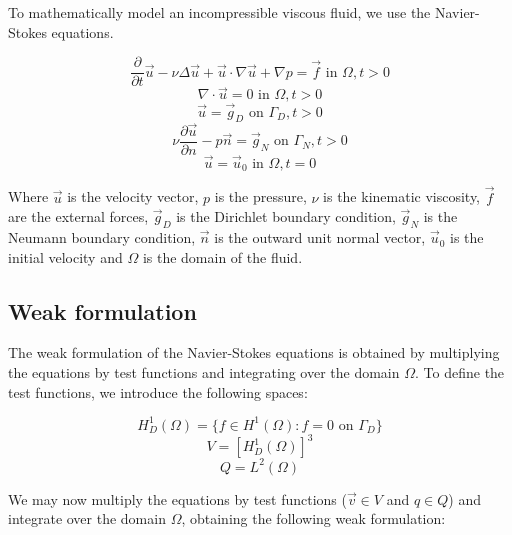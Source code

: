 To mathematically model an incompressible viscous fluid, we use the Navier-Stokes equations.

\begin{equation}
\frac{\partial}{\partial t} \vec{u} - \nu \Delta \vec{u} + \vec{u} \cdot \nabla \vec{u} + \nabla p = \vec{f} \text{ in } \Omega, t > 0 
\end{equation}
\begin{equation}
\nabla \cdot \vec{u} = 0 \text{ in } \Omega, t > 0
\end{equation}
\begin{equation}
\vec{u} = \vec{g}_D \text{ on } \Gamma_D, t > 0
\end{equation}
\begin{equation}
\nu \frac{\partial \vec{u}}{\partial n} - p \vec{n} = \vec{g}_N \text{ on } \Gamma_N, t > 0
\end{equation}
\begin{equation}
\vec{u} = \vec{u}_0 \text{ in } \Omega, t = 0
\end{equation}

Where $\vec{u}$ is the velocity vector, $p$ is the pressure, $\nu$ is the kinematic viscosity, $\vec{f}$ are the external forces, $\vec{g}_D$ is the Dirichlet boundary condition, $\vec{g}_N$ is the Neumann boundary condition, $\vec{n}$ is the outward unit normal vector, $\vec{u}_0$ is the initial velocity and $\Omega$ is the domain of the fluid.

\subsection{Weak formulation}
The weak formulation of the Navier-Stokes equations is obtained by multiplying the equations by test functions and integrating over the domain $\Omega$.
To define the test functions, we introduce the following spaces:

\begin{equation}
    H^1_D(\Omega) = \{f \in H^1(\Omega) : f = 0 \text{ on } \Gamma_D\}
\end{equation}
\begin{equation}
    V = [H^1_D(\Omega)]^3
\end{equation}
\begin{equation}
    Q = L^2(\Omega)
\end{equation}

We may now multiply the equations by test functions ($\vec{v} \in V$ and $q \in Q$) and integrate over the domain $\Omega$, obtaining the following weak formulation:

